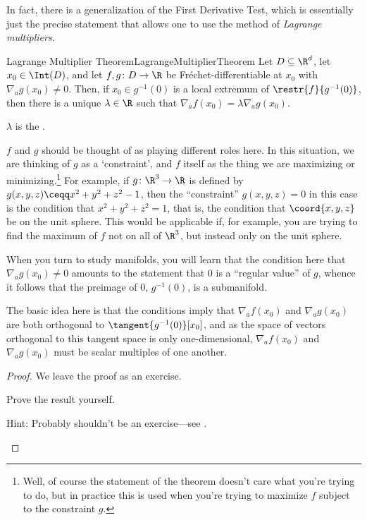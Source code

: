 In fact, there is a generalization of the First Derivative Test, which is essentially just the precise statement that allows one to use the method of \emph{Lagrange multipliers}.
\begin{thm}{Lagrange Multiplier Theorem}{LagrangeMultiplierTheorem}
Let $D\subseteq \R ^d$, let $x_0\in \Int (D)$, and let $f,g\colon D\rightarrow \R$ be Fréchet-differentiable at $x_0$ with $\nabla _ag(x_0)\neq 0$.  Then, if $x_0\in g^{-1}(0)$ is a local extremum of $\restr{f}{g^{-1}(0)}$, then there is a unique $\lambda \in \R$ such that $\nabla _af(x_0)=\lambda \nabla _ag(x_0)$.
\begin{rmk}
$\lambda$ is the .
\end{rmk}
\begin{rmk}
$f$ and $g$ should be thought of as playing different roles here.  In this situation, we are thinking of $g$ as a `constraint', and $f$ itself as the thing we are maximizing or minimizing.\footnote{Well, of course the statement of the theorem doesn't care what you're trying to do, but in practice this is used when you're trying to maximize $f$ subject to the constraint $g$.}  For example, if $g\colon \R ^3\rightarrow \R$ is defined by $g(x,y,z)\ceqq x^2+y^2+z^2-1$, then the ``constraint'' $g(x,y,z)=0$ in this case is the condition that $x^2+y^2+z^2=1$, that is, the condition that $\coord{x,y,z}$ be on the unit sphere.  This would be applicable if, for example, you are trying to find the maximum of $f$ not on all of $\R ^3$, but instead only on the unit sphere.
\end{rmk}
\begin{rmk}
When you turn to study manifolds, you will learn that the condition here that $\nabla _ag(x_0)\neq 0$ amounts to the statement that $0$ is a ``regular value'' of $g$, whence it follows that the preimage of $0$, $g^{-1}(0)$, is a submanifold.
\end{rmk}
\begin{rmk}
The basic idea here is that the conditions imply that $\nabla _af(x_0)$ and $\nabla _ag(x_0)$ are both orthogonal to $\tangent{g^{-1}(0)}[x_0]$, and as the space of vectors orthogonal to this tangent space is only one-dimensional, $\nabla _af(x_0)$ and $\nabla _ag(x_0)$ must be scalar multiples of one another.
\end{rmk}
\begin{proof}
We leave the proof as an exercise.
\begin{exr}[breakable=false]{}{}
Prove the result yourself.
\begin{rmk}
Hint:  Probably shouldn't be an exercise---see \cite[Theorem 5.8.3]{Sally}.
\end{rmk}
\end{exr}
\end{proof}
\end{thm}
